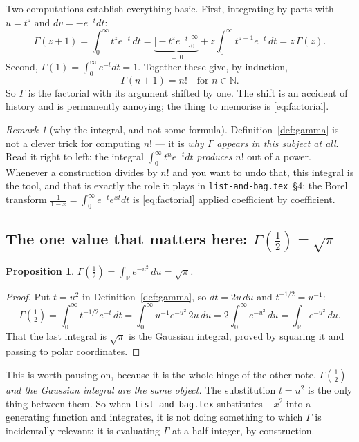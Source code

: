 \documentclass[11pt,a4paper]{article}
\newtheorem{proposition}[theorem]{Proposition}
\theoremstyle{definition}
\theoremstyle{remark}
\newtheorem{remark}[theorem]{Remark}
\newcommand{\RR}{\mathbb{R}}
\newcommand{\NN}{\mathbb{N}}
\newcommand{\dd}{\,d}
\begin{document}
Two computations establish everything basic. First, integrating by parts with
$u = t^{z}$ and $dv = -e^{-t}dt$:
\[
  \Gamma(z+1) = \int_0^\infty t^{z}e^{-t}\dd t
  = \underbrace{\bigl[-t^z e^{-t}\bigr]_0^\infty}_{=\,0}
    + z\int_0^\infty t^{z-1}e^{-t}\dd t
  = z\,\Gamma(z) .
\]
Second, $\Gamma(1) = \int_0^\infty e^{-t}dt = 1$. Together these give, by induction,
\begin{equation}\label{eq:factorial}
  \boxed{\;\Gamma(n+1) = n! \quad\text{for } n \in \NN.\;}
\end{equation}
So $\Gamma$ is the factorial with its argument shifted by one. The shift is an
accident of history and is permanently annoying; the thing to memorise is
\eqref{eq:factorial}.

\begin{remark}[why the integral, and not some formula]\label{rem:whyintegral}
Definition~\ref{def:gamma} is not a clever trick for computing $n!$ --- it is
\emph{why $\Gamma$ appears in this subject at all}. Read it right to left: the
integral $\int_0^\infty t^n e^{-t}dt$ \emph{produces} $n!$ out of a power. Whenever a
construction divides by $n!$ and you want to undo that, this integral is the tool,
and that is exactly the role it plays in \texttt{list-and-bag.tex}~\S4: the Borel
transform $\frac{1}{1-x} = \int_0^\infty e^{-t}e^{xt}dt$ is \eqref{eq:factorial}
applied coefficient by coefficient.
\end{remark}

\subsection{The one value that matters here: $\Gamma(\tfrac12) = \sqrt{\pi}$}

\begin{proposition}\label{prop:half}
$\Gamma(\tfrac12) = \displaystyle\int_{\RR} e^{-u^2}\dd u = \sqrt{\pi}$.
\end{proposition}

\begin{proof}
Put $t = u^2$ in Definition~\ref{def:gamma}, so $dt = 2u\,du$ and $t^{-1/2} = u^{-1}$:
\[
  \Gamma(\tfrac12) = \int_0^\infty t^{-1/2}e^{-t}\dd t
  = \int_0^\infty u^{-1} e^{-u^2}\,2u \dd u
  = 2\int_0^\infty e^{-u^2}\dd u
  = \int_{\RR} e^{-u^2}\dd u .
\]
That the last integral is $\sqrt{\pi}$ is the Gaussian integral, proved by squaring it
and passing to polar coordinates.
\end{proof}

This is worth pausing on, because it is the whole hinge of the other note.
\emph{$\Gamma(\tfrac12)$ and the Gaussian integral are the same object.} The
substitution $t = u^2$ is the only thing between them. So when
\texttt{list-and-bag.tex} substitutes $-x^2$ into a generating function and
integrates, it is not doing something to which $\Gamma$ is incidentally relevant: it
is evaluating $\Gamma$ at a half-integer, by construction.
\end{document}
